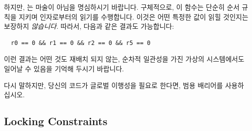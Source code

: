 \begin{enumerate}
하지만,  는 마술이 아님을 명심하시기 바랍니다.
구체적으로, 이 함수는 단순히 순서 규칙을 지키며 인자로부터의 읽기를 수행합니다.
이것은 어떤 특정한 값이 읽힐 것인지는 보장하지 {\em 않습니다}.  따라서, 다음과
같은 결과도 가능합니다:

{\scriptsize
\begin{verbatim}
  r0 == 0 && r1 == 0 && r2 == 0 && r5 == 0
\end{verbatim}
}

이런 결과는 어떤 것도 재배치 되지 않는, 순차적 일관성을 가진 가상의
시스템에서도 일어날 수 있음을 기억해 두시기 바랍니다.

다시 말하지만, 당신의 코드가 글로벌 이행성을 필요로 한다면, 범용 배리어를
사용하십시오.

\subsection{Locking Constraints}
\label{sec:advsync:Locking Constraints}


\end{enumerate}
